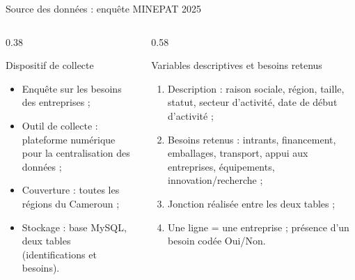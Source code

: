 \documentclass[aspectratio=169, 10pt]{beamer}
\begin{document}
\begin{frame}{Source des données : enquête MINEPAT 2025}
    \begin{columns}[T]
        \begin{column}{0.38\textwidth}
            \begin{block}{Dispositif de collecte}
                \begin{itemize}
                    \item Enquête sur les besoins des entreprises ;
                    \item Outil de collecte : plateforme numérique pour la centralisation des données ;
                    \item Couverture : toutes les régions du Cameroun ;
                    \item Stockage : base MySQL, deux tables (identifications et besoins).
                \end{itemize}
            \end{block}
        \end{column}
        \begin{column}{0.58\textwidth}
            \begin{block}{Variables descriptives et besoins retenus}
                \begin{enumerate}
                    \item Description : raison sociale, région, taille, statut, secteur d'activité, date de début d'activité ;
                    \item Besoins retenus : intrants, financement, emballages, transport, appui aux entreprises, équipements, innovation/recherche ;
                    \item Jonction réalisée entre les deux tables ;
                    \item Une ligne = une entreprise ; présence d'un besoin codée Oui/Non.
                \end{enumerate}
            \end{block}
        \end{column}
    \end{columns}
\end{frame}
\end{document}
